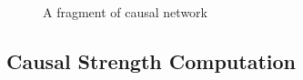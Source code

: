 %

\begin{figure}[th]
\centering
{}
\caption{A fragment of causal network}
\label{fig:causalnet}
\end{figure}

%


%
\subsection{Causal Strength Computation}
\label{sec:causalstrength}
%


